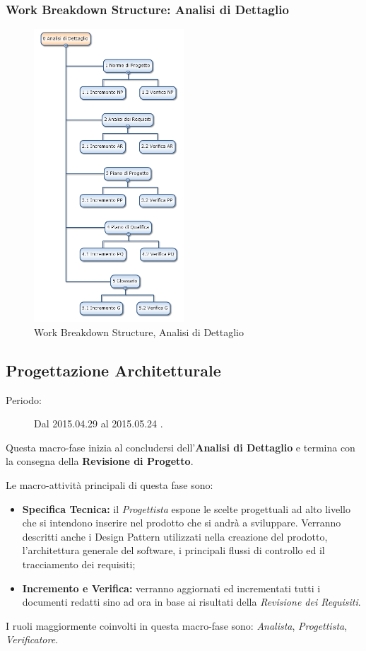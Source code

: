 \subsubsection{Work Breakdown Structure: Analisi di Dettaglio}
\begin{figure}[h]
	\centering
	\includegraphics[width=0.5\textwidth]{./img/wbs_analisi_dettaglio.png}
	\caption{Work Breakdown Structure, Analisi di Dettaglio}
\end{figure}

\newpage
\subsection{Progettazione Architetturale}
\begin{description}
	\item[Periodo:] Dal 2015.04.29 al 2015.05.24 .
\end{description}
Questa macro-fase inizia al concludersi dell'\textbf{Analisi di Dettaglio} e termina con la consegna della \textbf{Revisione di Progetto}. 

\noindent Le macro-attività principali di questa fase sono:
\begin{itemize}
	\item \textbf{Specifica Tecnica:} il \textit{Progettista} espone le scelte progettuali ad alto livello che si intendono inserire nel prodotto che si andrà a sviluppare.	Verranno descritti anche i Design Pattern utilizzati nella creazione del prodotto, l'architettura generale del software, i principali flussi di controllo ed il tracciamento dei requisiti;
	\item \textbf{Incremento e Verifica:} verranno aggiornati ed incrementati tutti i documenti redatti sino ad ora in base ai risultati della \textit{Revisione dei Requisiti}.	
\end{itemize}
I ruoli maggiormente coinvolti in questa macro-fase sono: \textit{Analista}, \textit{Progettista}, \textit{Verificatore}. 
